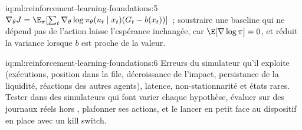 \begin{solution}{iq:ml:reinforcement-learning-foundations:5}
$\nabla_\theta J = \E_\pi[\sum_t\nabla_\theta\log\pi_\theta(u_t\mid x_t)(G_t - b(x_t))]$~; soustraire une baseline qui ne
dépend pas de l'action laisse l'espérance inchangée, car $\E[\nabla\log\pi] = 0$, et réduit la variance lorsque $b$
est proche de la valeur.
\end{solution}

\begin{solution}{iq:ml:reinforcement-learning-foundations:6}
Erreurs du simulateur qu'il exploite (exécutions, position dans la file, décroissance de l'impact, persistance de la liquidité, réactions des autres agents), latence,
non-stationnarité et états rares. Tester dans des simulateurs qui font varier chaque hypothèse, évaluer sur des journaux réels hors , plafonner ses
actions, et le lancer en petit face au dispositif en place avec un kill switch.
\end{solution}
